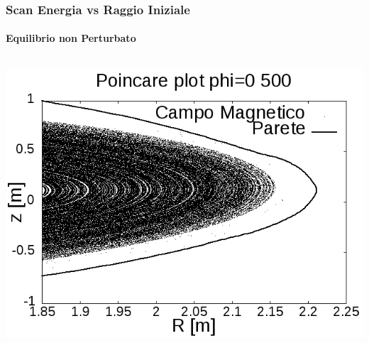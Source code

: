 \begin{frame}
\frametitle{Scan Energia vs Raggio Iniziale}
\framesubtitle{Equilibrio non Perturbato}
\begin{columns}
	\begin{column}{0.4\textwidth}
		\begin{center}
		\includegraphics[scale=0.18]{Immagini/Simulazioni/Poincare/poincare_500.png}
		\end{center}
		\begin{center}
		

\end{center}
\end{column}
\end{columns}
\end{frame}
